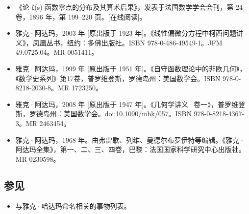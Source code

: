 \begin{itemize}
\item 《论 ζ(s) 函数零点的分布及其算术后果》，发表于法国数学学会会刊，第 24 卷，1896 年，第 199–220 页。[在线阅读]。
\item 雅克·阿达玛，2003 年 [原出版于 1923 年]。《线性偏微分方程中柯西问题讲义》，凤凰丛书，纽约：多佛出版社。ISBN 978-0-486-49549-1。JFM 49.0725.04。MR 0051411。
\item 雅克·阿达玛，1999 年 [原出版于 1951 年]。《自守函数理论中的非欧几何》，《数学史系列》第17卷，普罗维登斯，罗德岛州：美国数学会。ISBN 978-0-8218-2030-8。MR 1723250。
\item 雅克·阿达玛，2008 年 [原出版于 1947 年]。《几何学讲义·卷一》，普罗维登斯，罗德岛州：美国数学会。doi:10.1090/mbk/057。ISBN 978-0-8218-4367-3。MR 2463454。
\item 雅克·阿达玛，1968 年。由弗雷歇、列维、曼德尔布罗伊特等编辑。《雅克·阿达玛全集》，第一、二、三、四卷，巴黎：法国国家科学研究中心出版社。MR 0230598。
\end{itemize}
\subsection{参见}
\begin{itemize}
\item 与雅克·哈达玛命名相关的事物列表。
\end{itemize}
